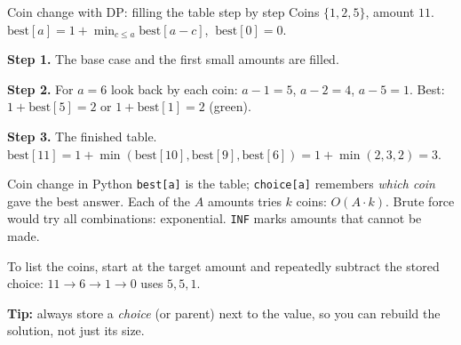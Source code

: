 \documentclass[aspectratio=169,10pt]{beamer}
\newcommand{\figtab}[2][0.5]{\begin{sfig}[#1]\end{sfig}}
\begin{document}
\begin{frame}{Coin change with DP: filling the table step by step}
{\small Coins $\{1,2,5\}$, amount $11$. $\mathrm{best}[a]=1+\min_{c\le a}\mathrm{best}[a-c]$, $\ \mathrm{best}[0]=0$.}

\vspace{1mm}
{\footnotesize\textbf{Step 1.} The base case and the first small amounts are filled.}\\
\figtab[0.13]{fig_coin1}

\vspace{1mm}
{\footnotesize\textbf{Step 2.} For $a=6$ look back by each coin: $a-1=5$, $a-2=4$, $a-5=1$. Best: $1+\mathrm{best}[5]=2$ or $1+\mathrm{best}[1]=2$ (green).}\\
\figtab[0.17]{fig_coin2}

\vspace{1mm}
{\footnotesize\textbf{Step 3.} The finished table. $\mathrm{best}[11]=1+\min(\mathrm{best}[10],\mathrm{best}[9],\mathrm{best}[6])=1+\min(2,3,2)=3$.}\\
\figtab[0.17]{fig_coin3}
\end{frame}

\begin{frame}[allowframebreaks]{Coin change in Python}
\vspace{2mm}
{\small
\texttt{best[a]} is the table; \texttt{choice[a]} remembers \emph{which coin} gave the best answer. Each of the $A$ amounts tries $k$ coins: $O(A\cdot k)$. Brute force would try all combinations: exponential. \texttt{INF} marks amounts that cannot be made.}
\framebreak
{}
\vspace{2mm}
\vspace{2mm}
{\small
To list the coins, start at the target amount and repeatedly subtract the stored choice: $11\to6\to1\to0$ uses $5,5,1$.

\vspace{1mm}
\textbf{Tip:} always store a \emph{choice} (or parent) next to the value, so you can rebuild the solution, not just its size.}
\end{frame}
\end{document}

